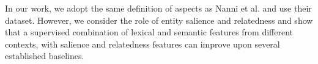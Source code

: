\documentclass[sigconf,authordraft]{acmart}
\begin{document}




In our work, we adopt the same definition of aspects as Nanni  et al. \cite{nanni2018entity} and use their dataset. However, we consider the role of entity salience and relatedness and show that a supervised combination of lexical and semantic features from different contexts, with salience and relatedness features can improve upon several established baselines.

\end{document}
